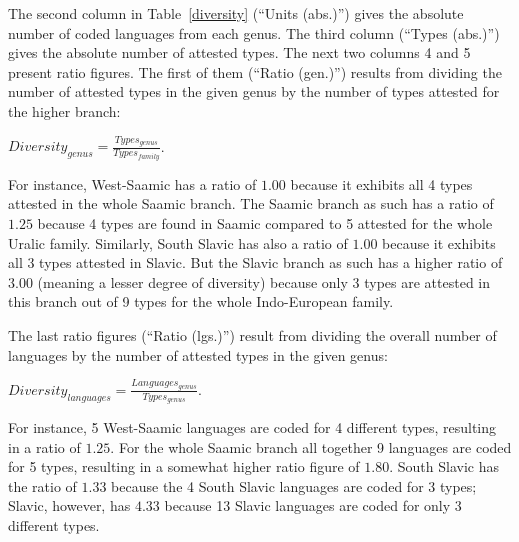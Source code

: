 The second column in Table~\ref{diversity} (“Units (abs.)”) gives the absolute number of coded languages from each genus. The third column (“Types (abs.)”) gives the absolute number of attested types. The next two columns 4 and 5 present ratio figures. The first of them  (“Ratio (gen.)”) results from dividing the number of attested types in the given genus by the number of types attested for the higher branch:\medskip

$Diversity_{genus} = \frac{Types_{genus}}{Types_{family}}$.\medskip

\noindent For instance, West-Saamic has a ratio of $1.00$ because it exhibits all 4 types attested in the whole Saamic branch. The Saamic branch as such has a ratio of $1.25$ because 4 types are found in Saamic compared to 5 attested for the whole Uralic family. Similarly, South Slavic has also a ratio of $1.00$ because it exhibits all 3 types attested in Slavic. But the Slavic branch as such has a higher ratio of $3.00$ (meaning a lesser degree of diversity) because only 3 types are attested in this branch out of 9 types for the whole Indo-European family. 

The last ratio figures (“Ratio (lgs.)”) result from dividing the overall number of languages by the number of attested types in the given genus:\medskip

$Diversity_{languages} = \frac{Languages_{genus}}{Types_{genus}}$.\medskip

\noindent For instance, 5 West-Saamic languages are coded for 4 different types, resulting in a ratio of $1.25$. For the whole Saamic branch all together 9 languages are coded for 5 types, resulting in a somewhat higher ratio figure of $1.80$. South Slavic has the ratio of $1.33$ because the 4 South Slavic languages are coded for 3 types; Slavic, however, has $4.33$ because 13 Slavic languages are coded for only 3 different types.

